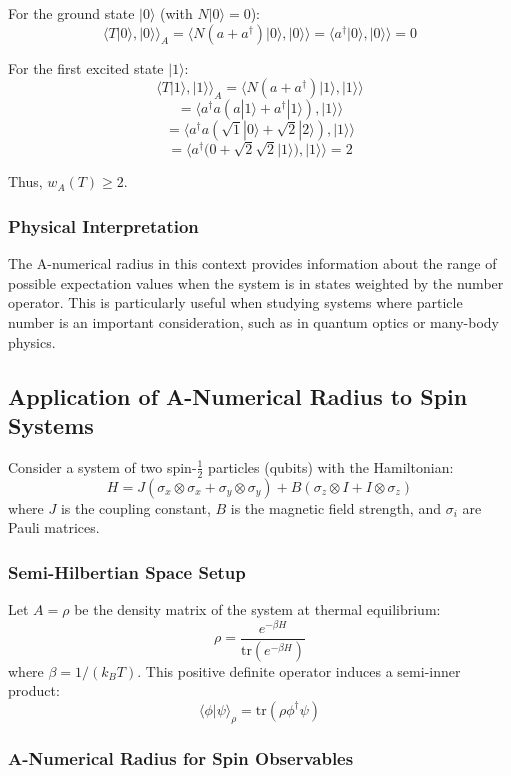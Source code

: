 \documentclass{article}
\newcommand {\tr}{\mathrm{tr}}
\begin{document}
For the ground state $|0\rangle$ (with $N|0\rangle = 0$):
\[ \langle T|0\rangle, |0\rangle \rangle_A = \langle N(a + a^\dagger)|0\rangle, |0\rangle \rangle = \langle a^\dagger|0\rangle, |0\rangle \rangle = 0 \]

For the first excited state $|1\rangle$:
\[ \langle T|1\rangle, |1\rangle \rangle_A = \langle N(a + a^\dagger)|1\rangle, |1\rangle \rangle \]
\[ = \langle a^\dagger a(a|1\rangle + a^\dagger|1\rangle), |1\rangle \rangle \]
\[ = \langle a^\dagger a(\sqrt{1}|0\rangle + \sqrt{2}|2\rangle), |1\rangle \rangle \]
\[ = \langle a^\dagger(0 + \sqrt{2}\sqrt{2}|1\rangle), |1\rangle \rangle = 2 \]

Thus, $w_A(T) \geq 2$.

\subsubsection{Physical Interpretation}

The A-numerical radius in this context provides information about the range of possible expectation values when the system is in states weighted by the number operator. This is particularly useful when studying systems where particle number is an important consideration, such as in quantum optics or many-body physics.
\subsection{Application of A-Numerical Radius to Spin Systems}

Consider a system of two spin-$\frac{1}{2}$ particles (qubits) with the Hamiltonian:
\[ H = J(\sigma_x \otimes \sigma_x + \sigma_y \otimes \sigma_y) + B(\sigma_z \otimes I + I \otimes \sigma_z) \]
where $J$ is the coupling constant, $B$ is the magnetic field strength, and $\sigma_i$ are Pauli matrices.

\subsubsection{Semi-Hilbertian Space Setup}

Let $A = \rho$ be the density matrix of the system at thermal equilibrium:
\[ \rho = \frac{e^{-\beta H}}{\tr(e^{-\beta H})} \]
where $\beta = 1/(k_B T)$. This positive definite operator induces a semi-inner product:
\[ \langle \phi|\psi\rangle_\rho = \tr(\rho \phi^\dagger \psi) \]

\subsubsection{A-Numerical Radius for Spin Observables}
\end{document}
